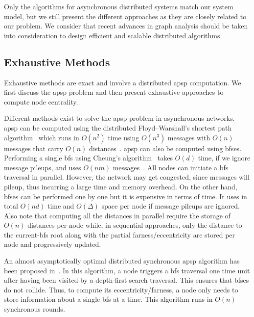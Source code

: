 Only the algorithms for asynchronous distributed systems match our system model, but we still present the different approaches as they are closely related to our problem. We consider that 
recent advances in graph analysis should be taken into consideration to design efficient and scalable distributed algorithms.


\subsection{Exhaustive Methods}

Exhaustive methods are exact and involve a distributed \gls{apsp} computation. We first discuss the \gls{apsp} problem and then present exhaustive approaches to compute node centrality.

Different methods exist to solve the \gls{apsp} problem in asynchronous networks. \gls{apsp} can be computed using the distributed Floyd–Warshall’s shortest path algorithm~\cite{toueg1980apsp} which runs in $O(n^2)$ time using $O(n^3)$ messages  with $O(n)$ messages that carry $O(n)$ distances~\cite{raynal2013distributed}. \gls{apsp} can also be computed using \gls{bfses}. Performing a single \gls{bfs} using Cheung's algorithm~\cite{cheung1983graph} takes $O(d)$ time, if we ignore message pileups, and uses $O(nm)$ messages~\cite{raynal2013distributed}. All nodes can initiate a \gls{bfs} traversal in parallel. However, the network may get congested, since messages will pileup, thus incurring a large time and memory overhead. On the other hand, \gls{bfses} can be performed one by one but it is expensive in terms of time. It uses in total $O(nd)$ time and $O(\Delta)$ space per node if message pileups are ignored. Also note that computing all the distances in parallel require the storage of $O(n)$ distances per node while, in sequential approaches, only the distance to the current-\gls{bfs} root along with the partial farness/eccentricity are stored per node and progressively updated.

An almost asymptotically optimal distributed synchronous \gls{apsp} algorithm has been proposed in~\cite{holzer2012optimal}. In this algorithm, a node triggers a \gls{bfs} traversal one time unit after having been visited by a depth-first search traversal. This ensures that \gls{bfses} do not collide. Thus, to compute its eccentricity/farness, a node only needs to store information about a single \gls{bfs} at a time. This algorithm runs in $O(n)$ synchronous rounds.

